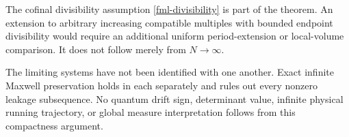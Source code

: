 The cofinal divisibility assumption
\eqref{fml-divisibility} is part of the theorem. An
extension to arbitrary increasing compatible multiples
with bounded endpoint divisibility would require an
additional uniform period-extension or local-volume
comparison. It does not follow merely from \(N\to\infty\).

The limiting systems have not been identified with
one another. Exact infinite Maxwell preservation holds
in each separately and rules out every nonzero leakage
subsequence. No quantum drift sign, determinant value,
infinite physical running trajectory, or global
measure interpretation follows from this compactness
argument.
